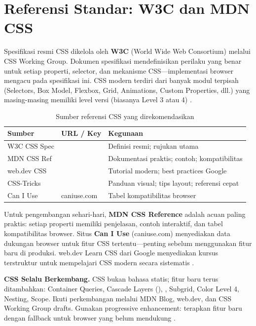 ﻿\section{Referensi Standar: W3C dan MDN CSS}

Spesifikasi resmi CSS dikelola oleh \textbf{W3C} (World Wide Web Consortium) melalui CSS Working Group. Dokumen spesifikasi mendefinisikan perilaku yang benar untuk setiap properti, selector, dan mekanisme CSS---implementasi browser mengacu pada spesifikasi ini. CSS modern terdiri dari banyak modul terpisah (Selectors, Box Model, Flexbox, Grid, Animations, Custom Properties, dll.) yang masing-masing memiliki level versi (biasanya Level 3 atau 4) \cite{w3cCss}.

\begin{table}[H]
\centering
\begin{tabular}{|P{2.5cm}|P{4cm}|P{5.5cm}|}
\hline
\textbf{Sumber} & \textbf{URL / Key} & \textbf{Kegunaan} \\
\hline
W3C CSS Spec &  & Definisi resmi; rujukan utama \\
\hline
MDN CSS Ref &  & Dokumentasi praktis; contoh; kompatibilitas \\
\hline
web.dev CSS &  & Tutorial modern; best practices Google \\
\hline
CSS-Tricks &  & Panduan visual; tips layout; referensi cepat \\
\hline
Can I Use & caniuse.com & Tabel kompatibilitas browser \\
\hline
\end{tabular}
\caption{Sumber referensi CSS yang direkomendasikan}
\end{table}

Untuk pengembangan sehari-hari, \textbf{MDN CSS Reference} adalah acuan paling praktis: setiap properti memiliki penjelasan, contoh interaktif, dan tabel kompatibilitas browser. Situs \textbf{Can I Use} (caniuse.com) menyediakan data dukungan browser untuk fitur CSS tertentu---penting sebelum menggunakan fitur baru di produksi. web.dev Learn CSS dari Google menyediakan kursus terstruktur untuk mempelajari CSS modern secara sistematis \cite{webdevCss}.

\begin{konsep}
\textbf{CSS Selalu Berkembang.} CSS bukan bahasa statis; fitur baru terus ditambahkan: Container Queries, Cascade Layers (), , Subgrid, Color Level 4, Nesting, Scope. Ikuti perkembangan melalui MDN Blog, web.dev, dan CSS Working Group drafts. Gunakan progressive enhancement: terapkan fitur baru dengan fallback untuk browser yang belum mendukung \cite{w3cCss}.
\end{konsep}

